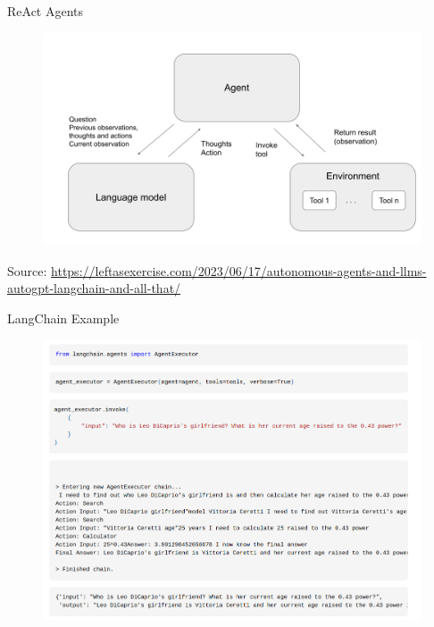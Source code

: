 \documentclass[handout]{beamer}
\begin{document}
\begin{frame}{ReAct Agents}
\scriptsize
      \begin{figure}[h]
	\includegraphics[scale = 0.3]{pics/react.png}
\end{figure}
Source: \url{https://leftasexercise.com/2023/06/17/autonomous-agents-and-llms-autogpt-langchain-and-all-that/}
\end{frame}


\begin{frame}{LangChain Example}
\scriptsize
      \begin{figure}[h]
	\includegraphics[scale = 0.3]{pics/agentexample.png}
\end{figure}
\end{frame}



\end{document}
